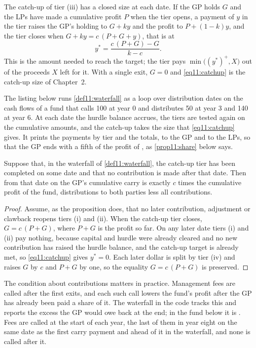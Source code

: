 \begin{chapterrefs}
The catch-up of tier (iii) has a closed size at each date. If the GP holds $G$ and the LPs have made
a cumulative profit $P$ when the tier opens, a payment of $y$ in the tier raises the GP's holding to
$G+ky$ and the profit to $P+(1-k)y$, and the tier closes when $G+ky=c\,(P+G+y)$, that is at
\begin{equation}\label{eq11:catchup}
  y^*=\frac{c\,(P+G)-G}{k-c}.
\end{equation}
This is the amount needed to reach the target; the tier pays $\min\bigl((y^*)^+,X\bigr)$ out of the
proceeds $X$ left for it. With a single exit, $G=0$ and \cref{eq11:catchup} is the catch-up size of
Chapter~2.

The listing below runs \cref{def11:waterfall} as a loop over distribution dates on the cash flows of
a fund that calls 100 at year 0 and distributes 50 at year 3 and 140 at year 6. At each
date the hurdle balance accrues, the tiers are tested again on the cumulative amounts, and the catch-up
takes the size that \cref{eq11:catchup} gives. It prints the payments by tier and the totals,
\wlGp{} to the GP and \wlLp{} to the LPs, so that the GP ends with a fifth of the profit of \wlProfit, as
\cref{prop11:share} below says.


\begin{proposition}\label{prop11:share}
Suppose that, in the waterfall of \cref{def11:waterfall}, the catch-up tier has been completed on
some date and that no contribution is made after that date. Then from that date on the GP's
cumulative carry is exactly $c$ times the cumulative profit of the fund, distributions to both parties
less all contributions.
\end{proposition}

\begin{proof}
Assume, as the proposition does, that no later contribution, adjustment or clawback reopens tiers (i)
and (ii). When the catch-up tier closes, $G=c\,(P+G)$, where $P+G$ is the profit so far. On any later date
tiers (i) and (ii) pay nothing, because capital and hurdle were already cleared and no new
contribution has raised the hurdle balance, and the catch-up target is already met, so
\cref{eq11:catchup} gives $y^*=0$. Each later dollar is split by tier (iv) and raises $G$ by $c$ and
$P+G$ by one, so the equality $G=c\,(P+G)$ is preserved.
\end{proof}

The condition about contributions matters in practice. Management fees are called after the first
exits, and each such call lowers the fund's profit after the GP has already been paid a share of it.
The waterfall in the code tracks this and reports the excess the GP would owe back at the end; in the
fund below it is \wfClaw{}. Fees are called at the start of each year, the last of them in year eight on
the same date as the first carry payment and ahead of it in the waterfall, and none is called after it.


\end{chapterrefs}
